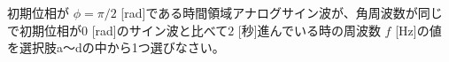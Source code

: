 初期位相が $\phi=\pi/2$ [rad]である時間領域アナログサイン波が、角周波数が同じで初期位相が$0$ [rad]のサイン波と比べて$2$ [秒]進んでいる時の周波数 $f$ [Hz]の値を選択肢a〜dの中から1つ選びなさい。
